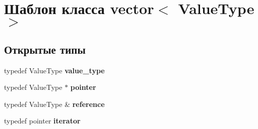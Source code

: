 \hypertarget{classvector}{}\section{Шаблон класса vector$<$ Value\+Type $>$}
\label{classvector}
\subsection*{Открытые типы}
\begin{DoxyCompactItemize}
\item 
\mbox{\label{classvector_a6cf53b2a874ea2441f78780cb81d6b52}} 
typedef Value\+Type {\bfseries value\+\_\+type}
\item 
\mbox{\label{classvector_a8e5a1e2312cdbb2b59ddaccd4a59a872}} 
typedef Value\+Type $\ast$ {\bfseries pointer}
\item 
\mbox{\label{classvector_a556166b15bd2eb905c3c3de1c1a5f692}} 
typedef Value\+Type \& {\bfseries reference}
\item 
\mbox{\label{classvector_a2a0886f454cf7285401b6e6baba63802}} 
typedef pointer {\bfseries iterator}
\end{DoxyCompactItemize}
